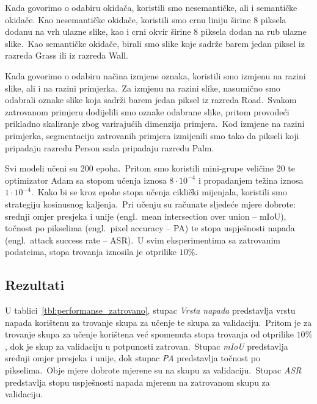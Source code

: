 \documentclass[times, utf8, seminar, numeric]{fer}
\begin{document}
Kada govorimo o odabiru okidača, koristili smo nesemantičke, ali i semantičke okidače.
Kao nesemantičke okidače, koristili smo crnu liniju širine 8 piksela dodanu na vrh ulazne slike, kao i crni okvir širine 8 piksela dodan na rub ulazne slike.\ 
Kao semantičke okidače, birali smo slike koje sadrže barem jedan piksel iz razreda Grass ili iz razreda Wall.\ 
  
Kada govorimo o odabiru načina izmjene oznaka, koristili smo izmjenu na razini slike, ali i na razini primjerka.\ 
Za izmjenu na razini slike, nasumično smo odabrali oznake slike koja sadrži barem jedan piksel iz razreda Road.\ 
Svakom zatrovanom primjeru dodijelili smo oznake odabrane slike, pritom provodeći prikladno skaliranje zbog varirajućih dimenzija primjera.\ 
Kod izmjene na razini primjerka, segmentaciju zatrovanih primjera izmijenili smo tako da pikseli koji pripadaju razredu Person sada pripadaju razredu Palm.
  
Svi modeli učeni su 200 epoha.\ Pritom smo koristili mini-grupe veličine 20 te optimizator Adam sa stopom učenja iznosa $8 \cdot 10^{-4}$ i propadanjem težina iznosa $1 \cdot 10^{-4}$.\
Kako bi se kroz epohe stopa učenja ciklički mijenjala, koristili smo strategiju kosinusnog kaljenja.\ 
Pri učenju su računate sljedeće mjere dobrote: srednji omjer presjeka i unije (engl.\ mean intersection over union – mIoU), točnost po pikselima (engl.\ pixel accuracy – PA) te stopa uspješnosti napada (engl.\ attack success rate – ASR).\ 
U svim eksperimentima sa zatrovanim podatcima, stopa trovanja iznosila je otprilike $10\%$. 

\subsection{Rezultati}

U tablici~\ref{tbl:performanse_zatrovano}, stupac \textit{Vrsta napada} predstavlja vrstu napada korištenu za trovanje skupa za učenje te skupa za validaciju.\ 
Pritom je za trovanje skupa za učenje korištena već spomenuta stopa trovanja od otprilike $10\%$, dok je skup za validaciju u potpunosti zatrovan.\ 
Stupac \textit{mIoU} predstavlja srednji omjer presjeka i unije, dok stupac \textit{PA} predstavlja točnost po pikselima.\ Obje mjere dobrote mjerene su na skupu za validaciju.\ 
Stupac \textit{ASR} predstavlja stopu uspješnosti napada mjerenu na zatrovanom skupu za validaciju.\
\end{document}

